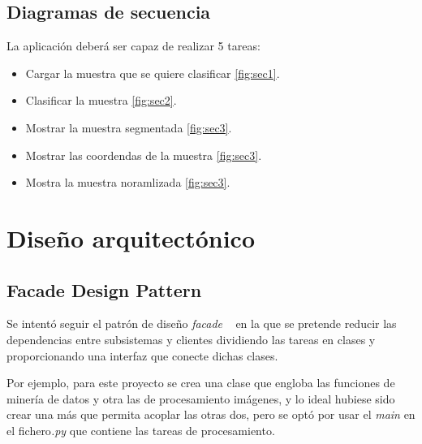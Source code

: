 \subsection{Diagramas de secuencia}
La aplicación deberá ser capaz de realizar 5 tareas:
\begin{itemize}
    \item Cargar la muestra que se quiere clasificar \ref{fig:sec1}.
    \item Clasificar la muestra \ref{fig:sec2}.
    \item Mostrar la muestra segmentada \ref{fig:sec3}.
    \item Mostrar las coordendas de la muestra \ref{fig:sec3}.
    \item Mostra la muestra noramlizada \ref{fig:sec3}.
\end{itemize}
\section{Diseño arquitectónico}
\subsection{Facade Design Pattern}
Se intentó seguir el patrón de diseño \emph{facade} ~\cite{wiki:facade} en la que se pretende reducir las dependencias entre subsistemas y clientes dividiendo las tareas en clases y proporcionando una interfaz que conecte dichas clases.

Por ejemplo, para este proyecto se crea una clase que engloba las funciones de minería de datos y otra las de procesamiento imágenes, y lo ideal hubiese sido crear una más que permita acoplar las otras dos, pero se optó por usar el \emph{main} en el fichero\emph{.py} que contiene las tareas de procesamiento.

